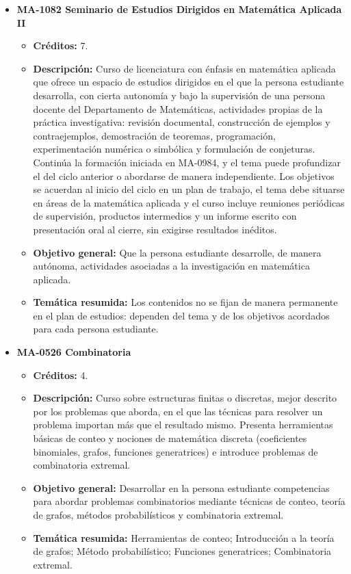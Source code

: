\begin{itemize}[leftmargin=1.3em, itemsep=10pt, topsep=4pt, label={\color{Azul-UCR}$\blacksquare$}]
\item {\color{Azul-UCR}\textbf{MA-1082 Seminario de Estudios Dirigidos en Matemática Aplicada II}}\par\nopagebreak\smallskip
\begin{itemize}[leftmargin=1.1em, itemsep=3pt, topsep=2pt, parsep=2pt, label={\textendash}]
\item \textbf{Créditos:} 7.
\item \textbf{Descripción:} Curso de licenciatura con énfasis en matemática aplicada que ofrece un espacio de estudios dirigidos en el que la persona estudiante desarrolla, con cierta autonomía y bajo la supervisión de una persona docente del Departamento de Matemáticas, actividades propias de la práctica investigativa: revisión documental, construcción de ejemplos y contraejemplos, demostración de teoremas, programación, experimentación numérica o simbólica y formulación de conjeturas. Continúa la formación iniciada en MA-0984, y el tema puede profundizar el del ciclo anterior o abordarse de manera independiente. Los objetivos se acuerdan al inicio del ciclo en un plan de trabajo, el tema debe situarse en áreas de la matemática aplicada y el curso incluye reuniones periódicas de supervisión, productos intermedios y un informe escrito con presentación oral al cierre, sin exigirse resultados inéditos.
\item \textbf{Objetivo general:} Que la persona estudiante desarrolle, de manera autónoma, actividades asociadas a la investigación en matemática aplicada.
\item \textbf{Temática resumida:} Los contenidos no se fijan de manera permanente en el plan de estudios: dependen del tema y de los objetivos acordados para cada persona estudiante.
\end{itemize}

\item {\color{Azul-UCR}\textbf{MA-0526 Combinatoria}}\par\nopagebreak\smallskip
\begin{itemize}[leftmargin=1.1em, itemsep=3pt, topsep=2pt, parsep=2pt, label={\textendash}]
\item \textbf{Créditos:} 4.
\item \textbf{Descripción:} Curso sobre estructuras finitas o discretas, mejor descrito por los problemas que aborda, en el que las técnicas para resolver un problema importan más que el resultado mismo. Presenta herramientas básicas de conteo y nociones de matemática discreta (coeficientes binomiales, grafos, funciones generatrices) e introduce problemas de combinatoria extremal.
\item \textbf{Objetivo general:} Desarrollar en la persona estudiante competencias para abordar problemas combinatorios mediante técnicas de conteo, teoría de grafos, métodos probabilísticos y combinatoria extremal.
\item \textbf{Temática resumida:} Herramientas de conteo; Introducción a la teoría de grafos; Método probabilístico; Funciones generatrices; Combinatoria extremal.
\end{itemize}


\end{itemize}
